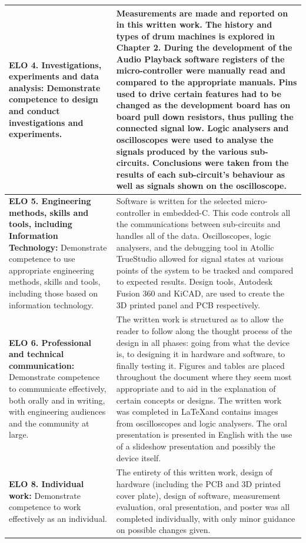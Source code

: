 \documentclass[12pt,a4paper]{report}
\begin{document}
\begin{longtable}[c]{|m{}|m{}|}
	\hline
	\textbf{ELO 4. Investigations, experiments and data analysis:} \newline Demonstrate competence to design and conduct investigations and experiments. & Measurements are made and reported on in this written work. The history and types of drum machines is explored in Chapter 2. During the development of the Audio Playback software registers of the micro-controller were manually read and compared to the appropriate manuals. Pins used to drive certain features had to be changed as the development board has on board pull down resistors, thus pulling the connected signal low. Logic analysers and oscilloscopes were used to analyse the signals produced by the various sub-circuits. Conclusions were taken from the results of each sub-circuit's behaviour as well as signals shown on the oscilloscope. \\
	\hline
	\textbf{ELO 5. Engineering methods, skills and tools, including Information Technology:} \newline Demonstrate competence to use appropriate engineering methods, skills and tools, including those based on information technology.& Software is written for the selected micro-controller in embedded-C. This code controls all the communications between sub-circuits and handles all of the data. Oscilloscopes, logic analysers, and the debugging tool in Atollic TrueStudio allowed for signal states at various points of the system to be tracked and compared to expected results. Design tools, Autodesk Fusion 360 and KiCAD, are used to create the 3D printed panel and PCB respectively.  \\
	\hline
	\textbf{ELO 6. Professional and technical communication:} \newline Demonstrate competence to communicate effectively, both orally and in writing, with engineering audiences and the community at large.& The written work is structured as to allow the reader to follow along the thought process of the design in all phases: going from what the device is, to designing it in hardware and software, to finally testing it. Figures and tables are placed throughout the document where they seem most appropriate and to aid in the explanation of certain concepts or designs. The written work was completed in \LaTeX and contains images from oscilloscopes and logic analysers. The oral presentation is presented in English with the use of a slideshow presentation and possibly the device itself. \\
	\hline
	\textbf{ELO 8. Individual work:} \newline Demonstrate competence to work effectively as an individual.& The entirety of this written work, design of hardware (including the PCB and 3D printed cover plate), design of software, measurement evaluation, oral presentation, and poster was all completed individually, with only minor guidance on possible changes given. \\

\end{longtable}
\end{document}
